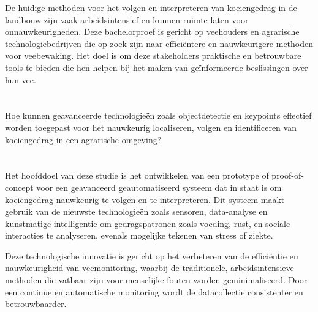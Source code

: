 De huidige methoden voor het volgen en interpreteren van koeiengedrag in de landbouw zijn vaak arbeidsintensief en kunnen ruimte laten voor onnauwkeurigheden. Deze bachelorproef is gericht op veehouders en agrarische technologiebedrijven die op zoek zijn naar efficiëntere en nauwkeurigere methoden voor veebewaking. Het doel is om deze stakeholders praktische en betrouwbare tools te bieden die hen helpen bij het maken van geïnformeerde beslissingen over hun vee.

\section{}%
\label{sec:onderzoeksvraag}


Hoe kunnen geavanceerde technologieën zoals objectdetectie en keypoints effectief worden toegepast voor het nauwkeurig localiseren, volgen en identificeren van koeiengedrag in een agrarische omgeving?

\section{}%
\label{sec:onderzoeksdoelstelling}


Het hoofddoel van deze studie is het ontwikkelen van een prototype of proof-of-concept voor een geavanceerd geautomatiseerd systeem dat in staat is om koeiengedrag nauwkeurig te volgen en te interpreteren. Dit systeem maakt gebruik van de nieuwste technologieën zoals sensoren, data-analyse en kunstmatige intelligentie om gedragspatronen zoals voeding, rust, en sociale interacties te analyseren, evenals mogelijke tekenen van stress of ziekte.

Deze technologische innovatie is gericht op het verbeteren van de efficiëntie en nauwkeurigheid van veemonitoring, waarbij de traditionele, arbeidsintensieve methoden die vatbaar zijn voor menselijke fouten worden geminimaliseerd. Door een continue en automatische monitoring wordt de datacollectie consistenter en betrouwbaarder.

